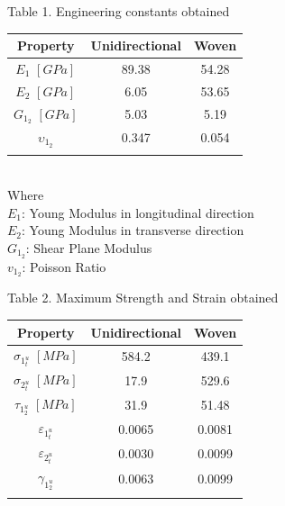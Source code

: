 \begin{table,array}%
\caption{Table 1. Engineering constants obtained}  %
\label{tab:1}       %
\begin{center}
\begin{tabular}{ccc}
\hline\noalign{\smallskip}
Property & Unidirectional & Woven  \\
\hline\noalign{\smallskip}\hline\noalign{\smallskip}
$E_1$ $[GPa]$& 89.38 & 54.28 \\
$E_2$ $[GPa]$& 6.05 & 53.65 \\
$G_1_2$ $[GPa]$& 5.03 & 5.19 \\
$\upsilon_1_2$& 0.347 & 0.054\\
\noalign{\smallskip}\hline
\end{tabular}
\end{center}
\end{table,array}\\
\vspace{0.25cm}
Where\\
$E_1$: Young Modulus in longitudinal direction\\
$E_2$: Young Modulus in transverse direction\\
$G_1_2$: Shear Plane Modulus \\
$v_1_2$: Poisson Ratio\\

\begin{table,array}%
\caption{Table 2. Maximum Strength and Strain obtained}  %
\label{tab:2}       %
\begin{center}
\begin{tabular}{ccc}
\hline\noalign{\smallskip}
Property & Unidirectional & Woven  \\
\hline\noalign{\smallskip}\hline\noalign{\smallskip}
$\sigma_1_t^u$ $[MPa]$& 584.2 & 439.1 \\
$\sigma_2_t^u$ $[MPa]$& 17.9 & 529.6 \\
$\tau_1_2^u$ $[MPa]$& 31.9 & 51.48 \\
$\varepsilon_1_t^u$& 0.0065 & 0.0081\\
$\varepsilon_2_t^u$& 0.0030 & 0.0099\\
$\gamma_1_2^u$& 0.0063 & 0.0099\\
\noalign{\smallskip}\hline
\end{tabular}
\end{center}
\end{table,array}\\
\vspace{0.25cm}

